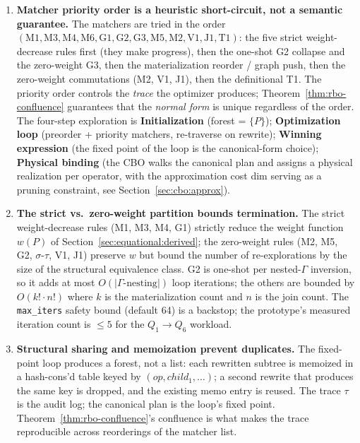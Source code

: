 \documentclass[sigconf]{acmart}
\theoremstyle{plain}
\theoremstyle{definition}
\theoremstyle{remark}
\begin{document}
\begin{enumerate}[leftmargin=*, itemsep=0pt]
  \item \textbf{Matcher priority order is a heuristic
  short-circuit, not a semantic guarantee.} The matchers
  are tried in the order
  $(\mathrm{M1}, \mathrm{M3}, \mathrm{M4}, \mathrm{M6},
  \mathrm{G1}, \mathrm{G2}, \mathrm{G3}, \mathrm{M5}, \mathrm{M2},
  \mathrm{V1}, \mathrm{J1}, \mathrm{T1})$: the five strict
  weight-decrease rules first (they make progress), then the
  one-shot G2 collapse and the zero-weight G3, then the
  materialization reorder / graph push, then the zero-weight
  commutations (M2, V1, J1), then the definitional T1. The
  priority order controls the \emph{trace} the optimizer
  produces; Theorem~\ref{thm:rbo-confluence} guarantees that
  the \emph{normal form} is unique regardless of the order.
  The four-step exploration is
  \textbf{Initialization} (forest = $\{P\}$);
  \textbf{Optimization loop} (preorder + priority
  matchers, re-traverse on rewrite);
  \textbf{Winning expression} (the fixed point of the
  loop is the canonical-form choice);
  \textbf{Physical binding} (the CBO walks the
  canonical plan and assigns a physical realization
  per operator, with the approximation cost dim
  serving as a pruning constraint, see
  Section~\ref{sec:cbo:approx}).
  \item \textbf{The strict vs.\ zero-weight partition
  bounds termination.} The strict weight-decrease
  rules (M1, M3, M4, G1) strictly reduce the
  weight function $w(P)$ of
  Section~\ref{sec:equational:derived}; the
  zero-weight rules (M2, M5, G2, $\sigma$-$\tau$, V1,
  J1) preserve $w$ but bound the number of
  re-explorations by the size of the structural
  equivalence class. G2 is one-shot per nested-$\Gamma$
  inversion, so it adds at most $O(|\Gamma\text{-nesting}|)$
  loop iterations; the others are bounded by
  $O(k! \cdot n!)$ where $k$ is the materialization
  count and $n$ is the join count. The
  \texttt{max\_iters} safety bound (default 64) is a
  backstop; the prototype's measured iteration
  count is $\le 5$ for the $Q_1 \to Q_6$ workload.
  \item \textbf{Structural sharing and memoization
  prevent duplicates.} The fixed-point loop produces
  a forest, not a list: each rewritten subtree is
  memoized in a hash-cons'd table keyed by
  $(\mathit{op}, \mathit{child}_1, \ldots)$; a second
  rewrite that produces the same key is dropped, and
  the existing memo entry is reused. The trace
  $\tau$ is the audit log; the canonical plan is
  the loop's fixed point. Theorem~\ref{thm:rbo-confluence}'s
  confluence is what makes the trace reproducible
  across reorderings of the matcher list.
\end{enumerate}
\end{document}
